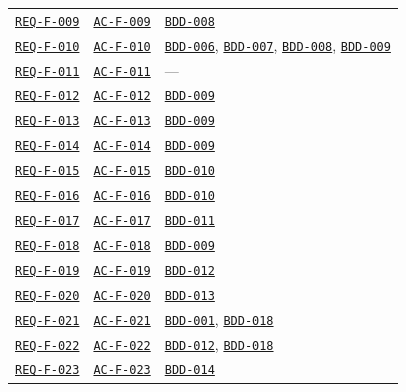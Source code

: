 \documentclass[11pt,a4paper]{article}
\begin{document}
\begin{longtable}{p{3.1cm} p{3.0cm} >{\raggedright\arraybackslash}p{9.1cm}}
\hyperlink{REQ-F-009}{\texttt{REQ-F-009}} & \hyperlink{AC-F-009}{\texttt{AC-F-009}} & \hyperlink{BDD-008}{\texttt{BDD-008}} \\
\hyperlink{REQ-F-010}{\texttt{REQ-F-010}} & \hyperlink{AC-F-010}{\texttt{AC-F-010}} & \hyperlink{BDD-006}{\texttt{BDD-006}}, \hyperlink{BDD-007}{\texttt{BDD-007}}, \hyperlink{BDD-008}{\texttt{BDD-008}}, \hyperlink{BDD-009}{\texttt{BDD-009}} \\
\hyperlink{REQ-F-011}{\texttt{REQ-F-011}} & \hyperlink{AC-F-011}{\texttt{AC-F-011}} & — \\
\hyperlink{REQ-F-012}{\texttt{REQ-F-012}} & \hyperlink{AC-F-012}{\texttt{AC-F-012}} & \hyperlink{BDD-009}{\texttt{BDD-009}} \\
\hyperlink{REQ-F-013}{\texttt{REQ-F-013}} & \hyperlink{AC-F-013}{\texttt{AC-F-013}} & \hyperlink{BDD-009}{\texttt{BDD-009}} \\
\hyperlink{REQ-F-014}{\texttt{REQ-F-014}} & \hyperlink{AC-F-014}{\texttt{AC-F-014}} & \hyperlink{BDD-009}{\texttt{BDD-009}} \\
\hyperlink{REQ-F-015}{\texttt{REQ-F-015}} & \hyperlink{AC-F-015}{\texttt{AC-F-015}} & \hyperlink{BDD-010}{\texttt{BDD-010}} \\
\hyperlink{REQ-F-016}{\texttt{REQ-F-016}} & \hyperlink{AC-F-016}{\texttt{AC-F-016}} & \hyperlink{BDD-010}{\texttt{BDD-010}} \\
\hyperlink{REQ-F-017}{\texttt{REQ-F-017}} & \hyperlink{AC-F-017}{\texttt{AC-F-017}} & \hyperlink{BDD-011}{\texttt{BDD-011}} \\
\hyperlink{REQ-F-018}{\texttt{REQ-F-018}} & \hyperlink{AC-F-018}{\texttt{AC-F-018}} & \hyperlink{BDD-009}{\texttt{BDD-009}} \\
\hyperlink{REQ-F-019}{\texttt{REQ-F-019}} & \hyperlink{AC-F-019}{\texttt{AC-F-019}} & \hyperlink{BDD-012}{\texttt{BDD-012}} \\
\hyperlink{REQ-F-020}{\texttt{REQ-F-020}} & \hyperlink{AC-F-020}{\texttt{AC-F-020}} & \hyperlink{BDD-013}{\texttt{BDD-013}} \\
\hyperlink{REQ-F-021}{\texttt{REQ-F-021}} & \hyperlink{AC-F-021}{\texttt{AC-F-021}} & \hyperlink{BDD-001}{\texttt{BDD-001}}, \hyperlink{BDD-018}{\texttt{BDD-018}} \\
\hyperlink{REQ-F-022}{\texttt{REQ-F-022}} & \hyperlink{AC-F-022}{\texttt{AC-F-022}} & \hyperlink{BDD-012}{\texttt{BDD-012}}, \hyperlink{BDD-018}{\texttt{BDD-018}} \\
\hyperlink{REQ-F-023}{\texttt{REQ-F-023}} & \hyperlink{AC-F-023}{\texttt{AC-F-023}} & \hyperlink{BDD-014}{\texttt{BDD-014}} \\

\end{longtable}
\end{document}
